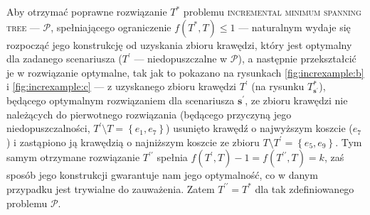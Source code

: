 Aby otrzymać poprawne rozwiązanie $T^{\ast}$ problemu \textsc{incremental minimum spanning tree} --- $\mathcal{P}$, spełniającego ograniczenie $f \left( T^{\ast}, T \right) \leqslant 1$ --- naturalnym wydaje się rozpocząć jego konstrukcję od uzyskania zbioru krawędzi, który jest optymalny dla zadanego scenariusza ($T^{\prime}$ --- niedopuszczalne w $\mathcal{P}$), a następnie przekształcić je w rozwiązanie optymalne, tak jak to pokazano na rysunkach \ref{fig:increxample:b} i \ref{fig:increxample:c} --- z uzyskanego zbioru krawędzi $T^{\prime}$ (na rysunku $T^{\ast}_{\textbf{s}^{\prime}}$), będącego optymalnym rozwiązaniem dla scenariusza $\textbf{s}^{\prime}$, ze zbioru krawędzi nie należących do pierwotnego rozwiązania (będącego przyczyną jego niedopuszczalności, $T^{\prime} \setminus T = \left\{ e_{1}, e_{7} \right\}$) usunięto krawędź o najwyższym koszcie ($e_{7}$) i zastąpiono ją krawędzią o najniższym koszcie ze zbioru $T \setminus T^{\prime} = \left\{ e_{5}, e_{9} \right\}$. Tym samym otrzymane rozwiązanie $T^{\prime\prime}$ spełnia $f \left( T^{\prime}, T \right) - 1 = f \left( T^{\prime\prime}, T \right) = k$, zaś sposób jego konstrukcji gwarantuje nam jego optymalność, co w danym przypadku jest trywialne do zauważenia. Zatem $T^{\prime\prime} = T^{\ast}$ dla tak zdefiniowanego problemu $\mathcal{P}$.

